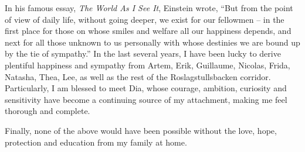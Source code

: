 \begin{acknowledgements}
  In his famous essay, \emph{\small The World As I See It}, Einstein wrote,
  ``But from the point of view of daily life, without going deeper, we exist for our fellowmen --
  in the first place for those on whose smiles and welfare all our happiness depends,
  and next for all those unknown to us personally with whose destinies we are bound up by the tie of sympathy.''
  In the last several years, I have been lucky to derive plentiful happiness and sympathy from Artem, Erik, Guillaume, Nicolas, Frida, Natasha, Thea, Lee,
  as well as the rest of the Roslagstullsbacken corridor.
  Particularly, I am blessed to meet Dia, whose courage, ambition, curiosity and sensitivity have become a continuing source of my attachment,
  making me feel thorough and complete.
  
  Finally, none of the above would have been possible without the love, hope, protection and education from my family at home.
  
  


  
  
\end{acknowledgements}
